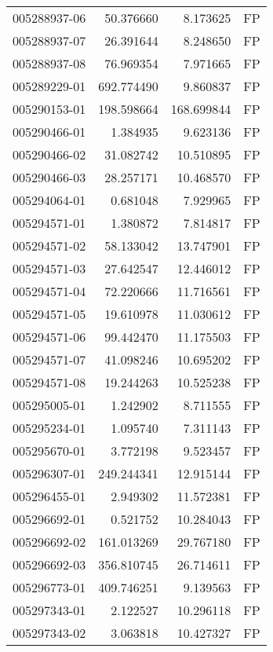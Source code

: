 \begin{tabular}{lrrl}
005288937-06 &   50.376660 &       8.173625 &   FP \\
005288937-07 &   26.391644 &       8.248650 &   FP \\
005288937-08 &   76.969354 &       7.971665 &   FP \\
005289229-01 &  692.774490 &       9.860837 &   FP \\
005290153-01 &  198.598664 &     168.699844 &   FP \\
005290466-01 &    1.384935 &       9.623136 &   FP \\
005290466-02 &   31.082742 &      10.510895 &   FP \\
005290466-03 &   28.257171 &      10.468570 &   FP \\
005294064-01 &    0.681048 &       7.929965 &   FP \\
005294571-01 &    1.380872 &       7.814817 &   FP \\
005294571-02 &   58.133042 &      13.747901 &   FP \\
005294571-03 &   27.642547 &      12.446012 &   FP \\
005294571-04 &   72.220666 &      11.716561 &   FP \\
005294571-05 &   19.610978 &      11.030612 &   FP \\
005294571-06 &   99.442470 &      11.175503 &   FP \\
005294571-07 &   41.098246 &      10.695202 &   FP \\
005294571-08 &   19.244263 &      10.525238 &   FP \\
005295005-01 &    1.242902 &       8.711555 &   FP \\
005295234-01 &    1.095740 &       7.311143 &   FP \\
005295670-01 &    3.772198 &       9.523457 &   FP \\
005296307-01 &  249.244341 &      12.915144 &   FP \\
005296455-01 &    2.949302 &      11.572381 &   FP \\
005296692-01 &    0.521752 &      10.284043 &   FP \\
005296692-02 &  161.013269 &      29.767180 &   FP \\
005296692-03 &  356.810745 &      26.714611 &   FP \\
005296773-01 &  409.746251 &       9.139563 &   FP \\
005297343-01 &    2.122527 &      10.296118 &   FP \\
005297343-02 &    3.063818 &      10.427327 &   FP \\

\end{tabular}
